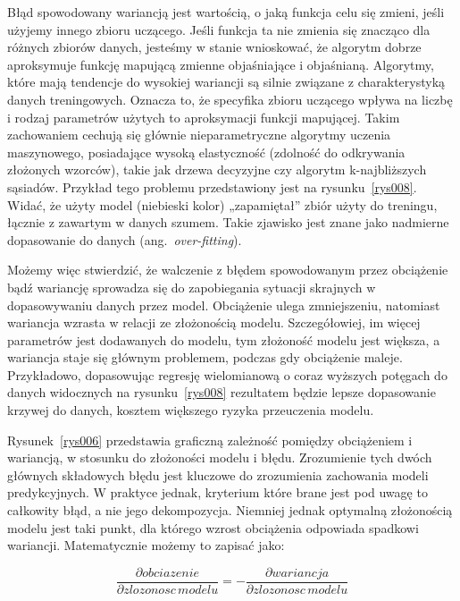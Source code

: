 \documentclass[12pt,a4paper,twoside,openany]{book}
\begin{document}
Błąd spowodowany wariancją jest wartością, o jaką funkcja celu się zmieni, jeśli użyjemy innego zbioru uczącego. Jeśli funkcja ta nie zmienia się znacząco dla różnych zbiorów danych, jesteśmy w stanie wnioskować, że algorytm dobrze aproksymuje funkcję mapującą zmienne objaśniające i objaśnianą. Algorytmy, które mają tendencje do wysokiej wariancji są silnie związane z charakterystyką danych treningowych. Oznacza to, że specyfika zbioru uczącego wpływa na liczbę i rodzaj parametrów użytych to aproksymacji funkcji mapującej. Takim zachowaniem cechują się głównie nieparametryczne algorytmy uczenia maszynowego, posiadające wysoką elastyczność (zdolność do odkrywania złożonych wzorców), takie jak drzewa decyzyjne czy algorytm k-najbliższych sąsiadów. Przykład tego problemu przedstawiony jest na rysunku~\ref{rys008}. Widać, że użyty model (niebieski kolor) „zapamiętał” zbiór użyty do treningu, łącznie z zawartym w danych szumem. Takie zjawisko jest znane jako nadmierne dopasowanie do danych (ang.~\textit{over-fitting}).


Możemy więc stwierdzić, że walczenie z błędem spowodowanym przez obciążenie bądź wariancję sprowadza się do zapobiegania sytuacji skrajnych w dopasowywaniu danych przez model. Obciążenie ulega zmniejszeniu, natomiast wariancja wzrasta w relacji ze złożonością modelu. Szczegółowiej, im więcej parametrów jest dodawanych do modelu, tym złożoność modelu jest większa, a wariancja staje się głównym problemem, podczas gdy obciążenie maleje. Przykładowo, dopasowując regresję wielomianową o coraz wyższych potęgach do danych widocznych na rysunku~\ref{rys008} rezultatem będzie lepsze dopasowanie krzywej do danych, kosztem większego ryzyka przeuczenia modelu. 

Rysunek~\ref{rys006} przedstawia graficzną zależność pomiędzy obciążeniem i wariancją, w stosunku do złożoności modelu i błędu. Zrozumienie tych dwóch głównych składowych błędu jest kluczowe do zrozumienia zachowania modeli predykcyjnych. W praktyce jednak, kryterium które brane jest pod uwagę to całkowity błąd, a nie jego dekompozycja. Niemniej jednak optymalną złożonością modelu jest taki punkt, dla którego wzrost obciążenia odpowiada spadkowi wariancji. Matematycznie możemy to zapisać jako:

\begin{equation} \label{wzor9g}
\frac{\partial obciazenie}{\partial zlozonosc\,  modelu} = -\frac{\partial wariancja}{\partial zlozonosc\,  modelu}
\end{equation}
\end{document}
